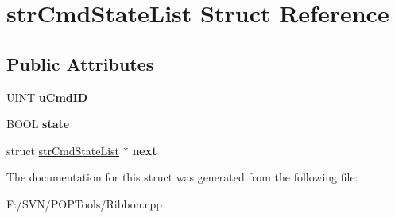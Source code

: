 \hypertarget{structstr_cmd_state_list}{\section{str\-Cmd\-State\-List Struct Reference}
\label{structstr_cmd_state_list}
}
\subsection*{Public Attributes}
\begin{DoxyCompactItemize}
\item 
\hypertarget{structstr_cmd_state_list_a1ee146cf64c9a75df8ffdc2b7b784c9e}{U\-I\-N\-T {\bfseries u\-Cmd\-I\-D}}\label{structstr_cmd_state_list_a1ee146cf64c9a75df8ffdc2b7b784c9e}

\item 
\hypertarget{structstr_cmd_state_list_ae3aeec8a299d3e1f7a170a30f451f587}{B\-O\-O\-L {\bfseries state}}\label{structstr_cmd_state_list_ae3aeec8a299d3e1f7a170a30f451f587}

\item 
\hypertarget{structstr_cmd_state_list_a8914e85c5f5d8c09c2b81b56d6ebb36b}{struct \hyperlink{structstr_cmd_state_list}{str\-Cmd\-State\-List} $\ast$ {\bfseries next}}\label{structstr_cmd_state_list_a8914e85c5f5d8c09c2b81b56d6ebb36b}

\end{DoxyCompactItemize}


The documentation for this struct was generated from the following file\-:\begin{DoxyCompactItemize}
\item 
F\-:/\-S\-V\-N/\-P\-O\-P\-Tools/Ribbon.\-cpp\end{DoxyCompactItemize}
